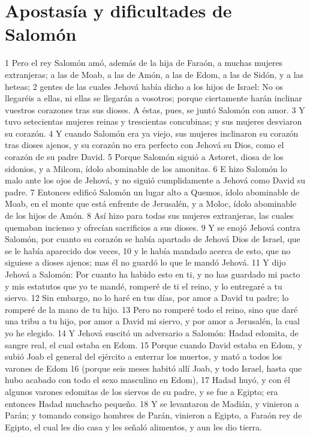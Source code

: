 \section*{Apostasía y dificultades de Salomón}

1 Pero el rey Salomón amó, además de la hija de Faraón, a muchas mujeres extranjeras; a las de Moab, a las de Amón, a las de Edom, a las de Sidón, y a las heteas;
2 gentes de las cuales Jehová había dicho a los hijos de Israel: No os llegaréis a ellas, ni ellas se llegarán a vosotros; porque ciertamente harán inclinar vuestros corazones tras sus dioses. A éstas, pues, se juntó Salomón con amor.
3 Y tuvo setecientas mujeres reinas y trescientas concubinas; y sus mujeres desviaron su corazón.
4 Y cuando Salomón era ya viejo, sus mujeres inclinaron su corazón tras dioses ajenos, y su corazón no era perfecto con Jehová su Dios, como el corazón de su padre David.
5 Porque Salomón siguió a Astoret, diosa de los sidonios, y a Milcom, ídolo abominable de los amonitas.
6 E hizo Salomón lo malo ante los ojos de Jehová, y no siguió cumplidamente a Jehová como David su padre.
7 Entonces edificó Salomón un lugar alto a Quemos, ídolo abominable de Moab, en el monte que está enfrente de Jerusalén, y a Moloc, ídolo abominable de los hijos de Amón.
8 Así hizo para todas sus mujeres extranjeras, las cuales quemaban incienso y ofrecían sacrificios a sus dioses.
9 Y se enojó Jehová contra Salomón, por cuanto su corazón se había apartado de Jehová Dios de Israel, que se le había aparecido dos veces,
10 y le había mandado acerca de esto, que no siguiese a dioses ajenos; mas él no guardó lo que le mandó Jehová.
11 Y dijo Jehová a Salomón: Por cuanto ha habido esto en ti, y no has guardado mi pacto y mis estatutos que yo te mandé, romperé de ti el reino, y lo entregaré a tu siervo.
12 Sin embargo, no lo haré en tus días, por amor a David tu padre; lo romperé de la mano de tu hijo.
13 Pero no romperé todo el reino, sino que daré una tribu a tu hijo, por amor a David mi siervo, y por amor a Jerusalén, la cual yo he elegido.
14 Y Jehová suscitó un adversario a Salomón: Hadad edomita, de sangre real, el cual estaba en Edom.
15 Porque cuando David estaba en Edom, y subió Joab el general del ejército a enterrar los muertos, y mató a todos los varones de Edom
16 (porque seis meses habitó allí Joab, y todo Israel, hasta que hubo acabado con todo el sexo masculino en Edom),
17 Hadad huyó, y con él algunos varones edomitas de los siervos de su padre, y se fue a Egipto; era entonces Hadad muchacho pequeño.
18 Y se levantaron de Madián, y vinieron a Parán; y tomando consigo hombres de Parán, vinieron a Egipto, a Faraón rey de Egipto, el cual les dio casa y les señaló alimentos, y aun les dio tierra.
